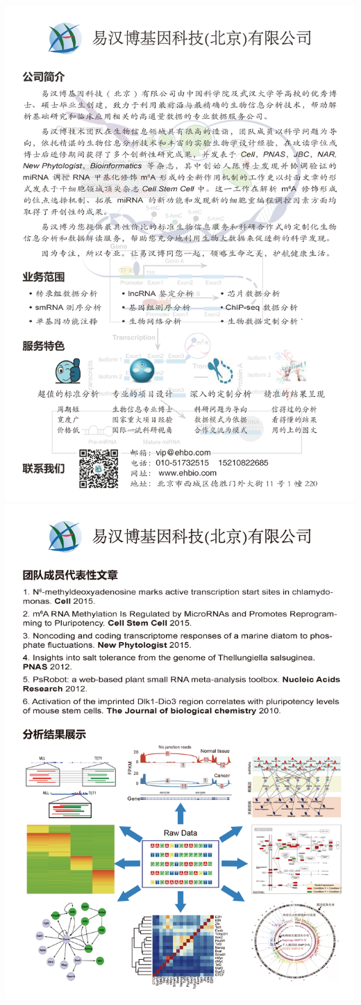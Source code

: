 \documentclass[]{article}
\numberwithin{figure}{section}
\numberwithin{table}{section}
\theoremstyle{definition}
\theoremstyle{definition}
\theoremstyle{definition}
\theoremstyle{remark}
\begin{document}
\begin{center}\includegraphics[width=0.99\linewidth,height=0.99\textheight,keepaspectratio]{ehbio/company_1} \includegraphics[width=0.99\linewidth,height=0.99\textheight,keepaspectratio]{ehbio/company_2} \end{center}
\end{document}
